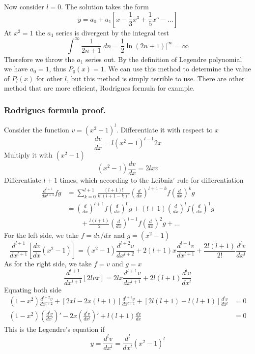 \documentclass[../main.tex]{subfiles}
\begin{document}
Now consider $l=0$. The solution takes the form 
\begin{equation*}
    y=a_0+a_1\left[x-\frac{1}{3}x^3+\frac{1}{5}x^5-\dots\right]
\end{equation*}
At $x^2=1$ the $a_1$ series is divergent by the integral test
\begin{equation*}
    \int^\infty \frac{1}{2n+1}\;dn=\frac{1}{2}\ln (2n+1)\bigg|^{\infty}=\infty
\end{equation*}
Therefore we throw the $a_1$ series out. By the definition of Legendre polynomial we have $a_0=1$, thus $P_0(x)=1$. We can use this method to determine the value of $P_l(x)$ for other $l$, but this method is simply terrible to use. There are other method that are more efficient, Rodrigues formula for example.

\subsubsection*{Rodrigues formula proof.} Consider the function $v=(x^2-1)^l$. Differentiate it with respect to $x$
\begin{equation*}
    \frac{dv}{dx}=l(x^2-1)^{l-1}2x
\end{equation*}
Multiply it with $(x^2-1)$
\begin{equation*}
    (x^2-1)\frac{dv}{dx}=2lxv
\end{equation*}
Differentiate $l+1$ times, which according to the Leibniz’ rule for differentiation
\begin{align*}
    \frac{d^{l+1}}{dx^{l+1}}fg&=\sum_{k=0}^{l+1}\frac{(l+1)!}{k!(l+1-k)!}\left(\frac{d}{dx}\right)^{l+1-k}f\left(\frac{d}{dx}\right)^{k}g\\
    &=\left(\frac{d}{dx}\right)^{l+1}f\left(\frac{d}{dx}\right)^{0}g+ (l+1)\left(\frac{d}{dx}\right)^{l}f\left(\frac{d}{dx}\right)^{1}g \\
    &\qquad+\frac{l(l+1)}{2}\left(\frac{d}{dx}\right)^{l-1}f\left(\frac{d}{dx}\right)^{2}g+\dots
\end{align*}
For the left side, we take $f=dv/dx$ and $g=(x^2-1)$
\begin{equation*}
    \frac{d^{l+1}}{dx^{l+1}}\left[\frac{dv}{dx}(x^2-1)\right]= (x^2-1)\frac{d^{l+2}v}{dx^{l+2}}+2(l+1)x\frac{d^{l+1}v}{dx^{l+1}}+\frac{2l(l+1)}{2!}\frac{d^{l}v}{dx^{l}}
\end{equation*}
As for the right side, we take $f=v$ and $g=x$
\begin{equation*}
    \frac{d^{l+1}}{dx^{l+1}}\left[2lvx\right]=2lx\frac{d^{l+1}v}{dx^{l+1}} +2l(l+1)\frac{d^{l}v}{dx^{l}}
\end{equation*}
Equating both side 
\begin{align*}
    (1-x^2)\frac{d^{l+2}v}{dx^{l+2}} +\left[2xl-2x(l+1)\right]\frac{d^{l+1}v}{dx^{l+1}} +\left[2l(l+1)-l(l+1)\right]\frac{d^{l}v}{dx^{l}}&=0\\
    (1-x^2)\left(\frac{d^lv}{dx^l}\right)' -2x\left(\frac{d^lv}{dx^l}\right)' +l(l+1)\frac{dv}{dx}&=0
\end{align*}
This is the Legendre's equation if
\begin{equation*}
    y=\frac{d^lv}{dx^l}=\frac{d^l}{dx^l} (x^2-1)^l
\end{equation*}
\end{document}
